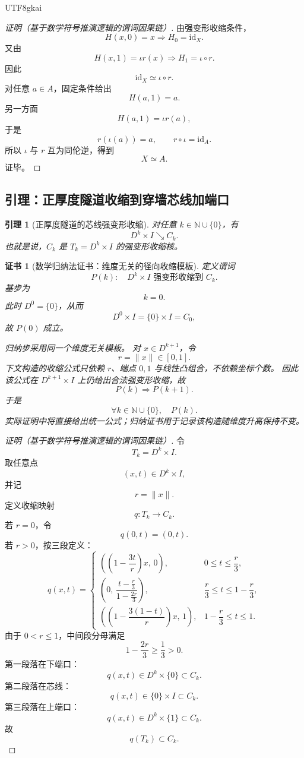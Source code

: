 \documentclass[12pt]{article}
\newtheorem{lemma}{引理}[section]
\newtheorem{Certificate}{证书}[section]
\newcommand{\NN}{\mathbb{N}}
\newcommand{\id}{\mathrm{id}}
\newcommand{\incl}{\iota}
\begin{document}
\begin{CJK*}{UTF8}{gkai}
\begin{proof}[证明（基于数学符号推演逻辑的谓词因果链）]
由强变形收缩条件，
\[
  H(x,0)=x
  \Longrightarrow
  H_0=\id_X.
\]
又由
\[
  H(x,1)=\incl r(x)
  \Longrightarrow
  H_1=\incl\circ r.
\]
因此
\[
  \id_X\simeq \incl\circ r.
\]
对任意 \(a\in A\)，固定条件给出
\[
  H(a,1)=a.
\]
另一方面
\[
  H(a,1)=\incl r(a),
\]
于是
\[
  r(\incl(a))=a,
  \qquad
  r\circ\incl=\id_A.
\]
所以 \(\incl\) 与 \(r\) 互为同伦逆，得到
\[
  X\simeq A.
\]
证毕。
\end{proof}

\subsection{引理：正厚度隧道收缩到穿墙芯线加端口}
\label{subsec:tex55-tunnel-spine-lemma}

\begin{lemma}[正厚度隧道的芯线强变形收缩]
\label{lem:tex55-tunnel-spine-sdr}
对任意 \(k\in\NN\cup\{0\}\)，有
\[
  D^k\times I\searrow C_k.
\]
也就是说，\(C_k\) 是 \(T_k=D^k\times I\) 的强变形收缩核。
\end{lemma}

\begin{Certificate}[数学归纳法证书：维度无关的径向收缩模板]
\label{cert:tex55-tunnel-spine-induction}
定义谓词
\[
  P(k):\quad D^k\times I\text{ 强变形收缩到 }C_k.
\]
基步为
\[
  k=0.
\]
此时 \(D^0=\{0\}\)，从而
\[
  D^0\times I=\{0\}\times I=C_0,
\]
故 \(P(0)\) 成立。

归纳步采用同一个维度无关模板。
对 \(x\in D^{k+1}\)，令
\[
  r=\|x\|\in[0,1].
\]
下文构造的收缩公式只依赖 \(r\)、端点 \(0,1\) 与线性凸组合，不依赖坐标个数。
因此该公式在 \(D^{k+1}\times I\) 上仍给出合法强变形收缩，故
\[
  P(k)\Longrightarrow P(k+1).
\]
于是
\[
  \forall k\in\NN\cup\{0\},\quad P(k).
\]
实际证明中将直接给出统一公式；归纳证书用于记录该构造随维度升高保持不变。
\end{Certificate}

\begin{proof}[证明（基于数学符号推演逻辑的谓词因果链）]
令
\[
  T_k=D^k\times I.
\]
取任意点
\[
  (x,t)\in D^k\times I,
\]
并记
\[
  r=\|x\|.
\]
定义收缩映射
\[
  q:T_k\to C_k.
\]
若 \(r=0\)，令
\[
  q(0,t)=(0,t).
\]
若 \(r>0\)，按三段定义：
\[
  q(x,t)=
  \begin{cases}
    \left(\left(1-\dfrac{3t}{r}\right)x,\,0\right),
    & 0\le t\le \dfrac r3,\\[1.2em]
    \left(0,\,\dfrac{t-\frac r3}{1-\frac{2r}{3}}\right),
    & \dfrac r3\le t\le 1-\dfrac r3,\\[1.2em]
    \left(\left(1-\dfrac{3(1-t)}{r}\right)x,\,1\right),
    & 1-\dfrac r3\le t\le 1.
  \end{cases}
\]
由于 \(0<r\le 1\)，中间段分母满足
\[
  1-\frac{2r}{3}\ge \frac13>0.
\]
第一段落在下端口：
\[
  q(x,t)\in D^k\times\{0\}\subset C_k.
\]
第二段落在芯线：
\[
  q(x,t)\in\{0\}\times I\subset C_k.
\]
第三段落在上端口：
\[
  q(x,t)\in D^k\times\{1\}\subset C_k.
\]
故
\[
  q(T_k)\subset C_k.
\]


\end{proof}
\end{CJK*}
\end{document}
